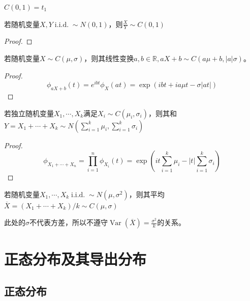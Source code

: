 \begin{proposition}
    $C(0,1)=t_1$
\end{proposition}

\begin{proposition}
    若随机变量$X,Y \operatorname{i.i.d.} \sim N(0,1)$，则$\frac{X}{Y} \sim C(0,1)$
\end{proposition}

\begin{proof}
\end{proof}

\begin{proposition}
    若随机变量$X \sim C(\mu, \sigma)$，则其线性变换$a,b \in \mathbb{R},aX + b \sim C(a \mu + b,|a| \sigma)$。
\end{proposition}

\begin{proof}
    \[ \phi_{aX + b}(t)=e^{ibt}\phi_X(a t)=\exp (ibt + ia\mu t-\sigma|a t|) \]
\end{proof}

\begin{proposition}
    若独立随机变量$X_1,\cdots ,X_k$满足$ X_i \sim C(\mu_i,\sigma_i)$，则其和$Y=X_1+\cdots +X_k \sim N(\sum_{i=1}^k\mu_i,\sum_{i=1}^k\sigma_i)$
\end{proposition}

\begin{proof}
    \[ \phi_{X_1+\cdots+ X_n} = \prod_{i=1}^n \phi_{X_i}(t)=\exp (it\sum_{i=1}^k\mu_i - |t|\sum_{i=1}^k \sigma_i) \]
\end{proof}

\begin{corollary}
    若随机变量$X_1,\cdots ,X_k \operatorname{i.i.d.} \sim N(\mu,\sigma^2)$，则其平均$\overline{X}=(X_1+\cdots +X_k)/k \sim C(\mu,\sigma)$
\end{corollary}

\begin{remark}
    此处的$\sigma$不代表方差，所以不遵守$\operatorname{Var}(\overline{X})=\frac{\sigma^2}{k}$的关系。
\end{remark}

\section{正态分布及其导出分布}

\subsection{正态分布}

